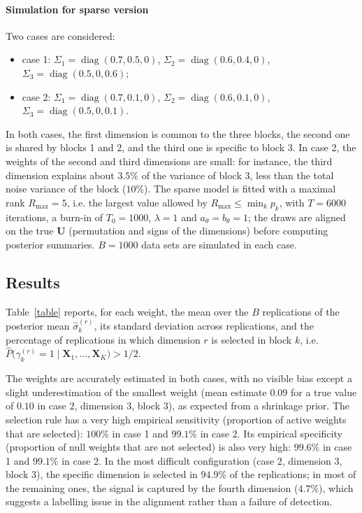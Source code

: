 \documentclass[11pt]{article}
\DeclareMathOperator{\diag}{diag}
\newcommand{\X}{\mathbf{X}}
\newcommand{\U}{\mathbf{U}}
\begin{document}
\paragraph{Simulation for sparse version} Two cases are considered:
\begin{itemize}
  \item case 1: $\Sigma_1=\diag(0.7,0.5,0)$, $\Sigma_2=\diag(0.6,0.4,0)$, $\Sigma_3=\diag(0.5,0,0.6)$;
  \item case 2: $\Sigma_1=\diag(0.7,0.1,0)$, $\Sigma_2=\diag(0.6,0.1,0)$, $\Sigma_3=\diag(0.5,0,0.1)$.
\end{itemize}
In both cases, the first dimension is common to the three blocks, the second one is shared by blocks 1 and 2, and the third one is specific to block 3. In case 2, the weights of the second and third dimensions are small: for instance, the third dimension explains about $3.5\%$ of the variance of block 3, less than the total noise variance of the block ($10\%$). 
The sparse model is fitted with a maximal rank $R_{\max}=5$, i.e. the largest value allowed by $R_{\max}\leq\min_kp_k$, with
$T=6000$ iterations, a burn-in of $T_0=1000$, $\lambda=1$ and $a_\theta=b_\theta=1$; the draws are aligned on the true $\U$ (permutation and signs of the dimensions) before computing posterior summaries. $B=1000$ data sets are simulated in each case.

\subsection{Results}
Table~\ref{table} reports, for each weight, the mean over the $B$ replications of the posterior mean $\hat\sigma_k^{(r)}$, its
standard deviation across replications, and the percentage of replications in which dimension $r$ is selected in block $k$, i.e.\ $\hat P\bigl(\gamma_k^{(r)}=1\mid\X_1,\ldots,\X_K\bigr)>1/2$.

The weights are accurately estimated in both cases, with no visible bias except a slight underestimation of the smallest weight (mean estimate $0.09$ for a true value of $0.10$ in case 2, dimension 3, block 3), as expected from a
shrinkage prior. The selection rule has a very high empirical sensitivity (proportion of active weights that are selected): $100\%$ in case 1 and $99.1\%$ in case 2. Its empirical specificity (proportion of null weights that are not
selected) is also very high: $99.6\%$ in case 1 and $99.1\%$ in case 2. In the most difficult configuration (case 2, dimension 3, block 3), the specific dimension is selected in $94.9\%$ of the replications; in most of the remaining
ones, the signal is captured by the fourth dimension ($4.7\%$), which suggests a labelling issue in the alignment rather than a failure of detection.
\end{document}
